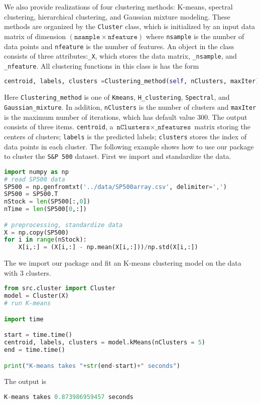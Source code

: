 We also provide realizations of four clustering methods: K-means, spectral clustering, hierarchical clustering, and Gaussian mixture modeling. These methods are organized by  the \texttt{Cluster} class, which is initialized by an input data matrix of dimension $(\texttt{nsample}\times \texttt{nfeature})$ where \texttt{nsample} is the number of data points and \texttt{nfeature} is the number of features.  An object in the class consists of three attributes:\texttt{\_X}, which stores the data matrix,  \texttt{\_nsample}, and  \texttt{\_nfeature}. All clustering functions in this class is  has the form 
\begin{lstlisting}[language=Python]
centroid, labels, clusters =Clustering_method(self, nClusters, maxIter)
\end{lstlisting}
Here \texttt{Clustering\_method} is one of \texttt{Kmeans}, \texttt{H\_clustering},  \texttt{Spectral}, and \texttt{Gaussian\_mixture}. In addition, \texttt{nClusters} is the number of clusters and \texttt{maxIter} is the maximum number of iterations, which has default value $300$. The output consists of three items.  \texttt{centroid}, a $\texttt{nClusters} \times \texttt{\_nfeatures} $ matrix storing the centers of clusters; \texttt{labels} is the predicted labels; \texttt{clusters} stores the index of data points in each cluster. The following example shows how to use our package to cluster the \texttt{S\&P 500} dataset. First we import and standardize the data.
\begin{lstlisting}[language=Python]
import numpy as np
# read SP500 data
SP500 = np.genfromtxt('../data/SP500array.csv', delimiter=',')
SP500 = SP500.T
nStock = len(SP500[:,0])
nTime = len(SP500[0,:])

# preprocessing, standardize data
X = np.copy(SP500)
for i in range(nStock):
    X[i,:] = (X[i,:] - np.mean(X[i,:]))/np.std(X[i,:])
\end{lstlisting}
  The we import our package and fit an K-means clustering model on the data with $3$ clusters.
 \begin{lstlisting}[language=Python] 
from src.cluster import Cluster
model = Cluster(X)
# run K-means

import time

start = time.time()
centroid, labels, clusters = model.kMeans(nClusters = 5)
end = time.time()

print("K-means takes "+str(end-start)+" seconds")
\end{lstlisting}
The output is 
 \begin{lstlisting}[language=Python] 
 K-means takes 0.873986959457 seconds
 \end{lstlisting}